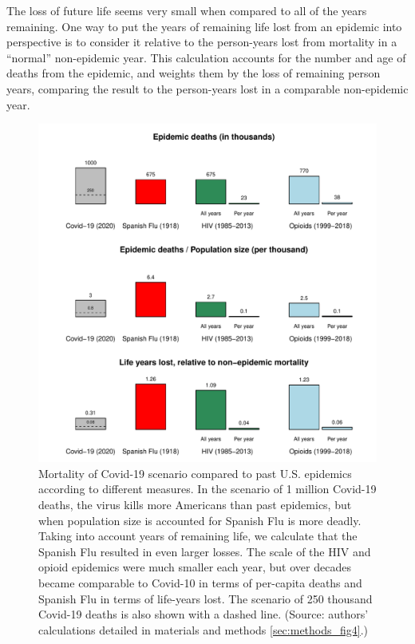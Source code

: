 \documentclass[9pt,twocolumn,twoside,lineno]{pnas-new}
\begin{document}
The loss of future life seems very small when compared to all of the
years remaining. One way to put the years of remaining life lost from
an epidemic into perspective is to consider it relative to the
person-years lost from mortality in a ``normal'' non-epidemic
year. This calculation accounts for the number and age of deaths from
the epidemic, and weights them by the loss of remaining person years,
comparing the result to the person-years lost in a comparable
non-epidemic year.

\begin{figure}%
\centering
\includegraphics[width=.8\linewidth]{./fig4_hiv_plus_new_dash}
\caption{Mortality of Covid-19 scenario compared to past
  U.S. epidemics according to different measures. In the scenario of 1
  million Covid-19 deaths, the virus kills more Americans than past
  epidemics, but when population size is accounted for Spanish Flu is
  more deadly. Taking into account years of remaining life, we
  calculate that the Spanish Flu resulted in even larger losses. The
  scale of the HIV and opioid epidemics were much smaller each year,
  but over decades became comparable to Covid-10 in terms of
  per-capita deaths and Spanish Flu in terms of life-years lost. The
  scenario of 250 thousand Covid-19 deaths is also shown with a dashed
  line.  (Source: authors’ calculations detailed in materials and
  methods \ref{sec:methods_fig4}.)}

\label{fig:epidemics}
\end{figure}
\end{document}
